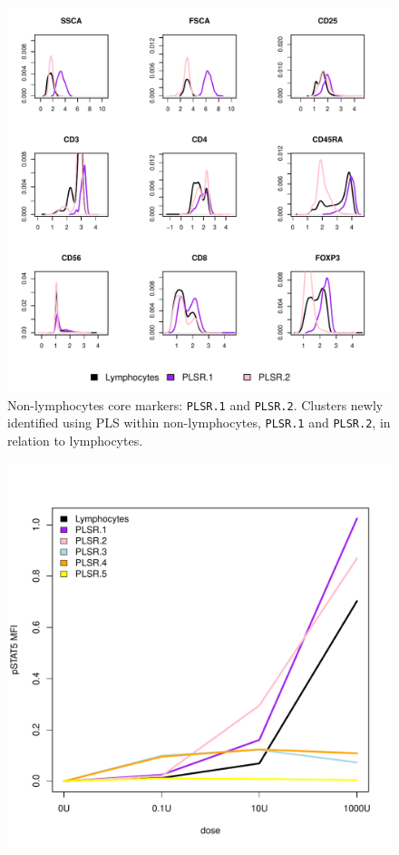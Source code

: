 \begin{figure}
\centering
\begin{minipage}{\textwidth}
\centering
\includegraphics[width=.8\linewidth]{figures/plsr-nonlymphocytes-clusters}
{ Non-lymphocytes core markers: \texttt{PLSR.1} and \texttt{PLSR.2}. }
{
Clusters newly identified using \gls{PLS} within non-lymphocytes, \texttt{PLSR.1} and \texttt{PLSR.2}, in relation to lymphocytes.
} 
\end{minipage}
\begin{minipage}{.5\textwidth}
\includegraphics[width=\linewidth]{figures/plsr-nonlymphocytes-dose-response.pdf}

\end{minipage}
\end{figure}
